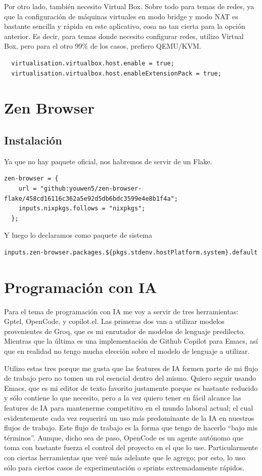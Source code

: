 \documentclass[11pt]{article}
\begin{document}
Por otro lado, también necesito Virtual Box. Sobre todo para temas de redes, ya que la configuración de máquinas virtuales en modo bridge y modo NAT es bastante sencilla y rápida en este aplicativo, cosa no tan cierta para la opción anterior. Es decir, para temas donde necesito configurar redes, utilizo Virtual Box, pero para el otro 99\% de los casos, prefiero QEMU/KVM.

\begin{verbatim}
  virtualisation.virtualbox.host.enable = true;
  virtualisation.virtualbox.host.enableExtensionPack = true;
\end{verbatim}
\section{Zen Browser}
\label{sec:orgf5e171d}

\subsection{Instalación}
\label{sec:org1d522e2}

Ya que no hay paquete oficial, nos habremos de servir de un Flake.

\begin{verbatim}
zen-browser = {
    url = "github:youwen5/zen-browser-flake/458cd16116c362a5e92d5db6bdc3599e4e8b1f4a";
    inputs.nixpkgs.follows = "nixpkgs";
  };
\end{verbatim}

Y luego lo declaramos como paquete de sistema

\begin{verbatim}
inputs.zen-browser.packages.${pkgs.stdenv.hostPlatform.system}.default
\end{verbatim}
\section{Programación con IA}
\label{sec:orgbd60740}

Para el tema de programación con IA me voy a servir de tres herramientas: Gptel, OpenCode, y copilot.el. Las primeras dos van a utilizar modelos provenientes de Groq, que es mi enrutador de modelos de lenguaje predilecto. Mientras que la última es una implementación de Github Copilot para Emacs, así que en realidad no tengo mucha elección sobre el modelo de lenguaje a utilizar.

Utilizo estas tres porque me gusta que las features de IA formen parte de mi flujo de trabajo pero no tomen un rol esencial dentro del mismo. Quiero seguir usando Emacs, que es mi editor de texto favorito justamente porque es bastante reducido y sólo contiene lo que necesito, pero a la vez quiero tener en fácil alcance las features de IA para mantenerme competitivo en el mundo laboral actual; el cual evidentemente cada vez requerirá un uso más predominante de la IA en nuestros flujos de trabajo. Este flujo de trabajo es la forma que tengo de hacerlo ``bajo mis términos''. Aunque, dicho sea de paso, OpenCode es un agente autónomo que toma con bastante fuerza el control del proyecto en el que lo use. Particularmente con ciertas herramientas que veré más adelante que le agrego; por esto, lo uso sólo para ciertos casos de experimentación o sprints extremadamente rápidos.
\end{document}
